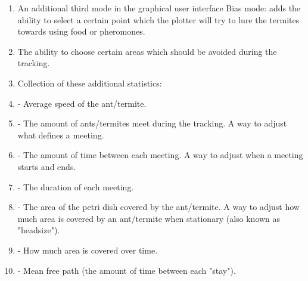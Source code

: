 \begin{enumerate}
	\item An additional third mode in the graphical user interface Bias mode: adds the ability to select a certain point which the plotter will try to lure the termites towards using food or pheromones.
    \item The ability to choose certain areas which should be avoided during the tracking.
    \item Collection of these additional statistics:
    \item - Average speed of the ant/termite.
    \item - The amount of ants/termites meet during the tracking. A way to adjust what defines a meeting.
    \item - The amount of time between each meeting. A way to adjust when a meeting starts and ends.
    \item - The duration of each meeting.
    \item - The area of the petri dish covered by the ant/termite. A way to adjust how much area is covered by an ant/termite when stationary (also known as "headsize").
    \item - How much area is covered over time.
    \item - Mean free path (the amount of time between each "stay").
\end{enumerate}


